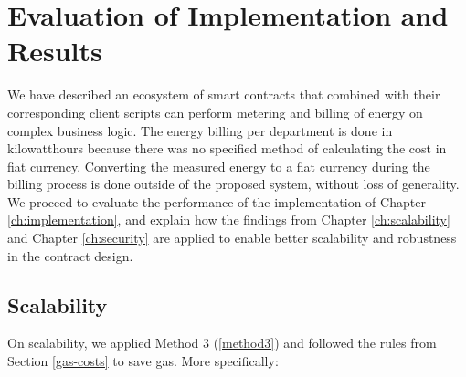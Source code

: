 \chapter{Evaluation of Implementation and Results}\label{ch:results}

We have described an ecosystem of smart contracts that combined with their corresponding client scripts can perform metering and billing of energy on complex business logic. The energy billing per department is done in kilowatthours because there was no specified method of calculating the cost in fiat currency. Converting the measured energy to a fiat currency during the billing process is done outside of the proposed system, without loss of generality. We proceed to evaluate the performance of the implementation of Chapter \ref{ch:implementation}, and explain how the findings from Chapter \ref{ch:scalability} and Chapter \ref{ch:security} are applied to enable better scalability and robustness in the contract design.

\section{Scalability}
On scalability, we applied Method 3 (\ref{method3}) and followed the rules from Section \ref{gas-costs} to save gas. More specifically:

